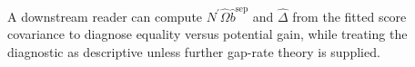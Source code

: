A downstream reader can compute \(N^{\prime}\widehat\Omega\widehat b^{\mathrm{sep}}\) and \(\widehat\Delta\) from the fitted score covariance to diagnose equality versus potential gain, while treating the diagnostic as descriptive unless further gap-rate theory is supplied.